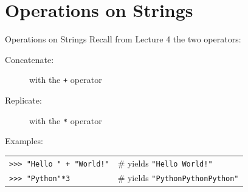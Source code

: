 \documentclass[t,handout,9pt]{beamer}
\begin{document}
\section{Operations on Strings}
\begin{frame}{Operations on Strings}
\vfill
Recall from Lecture 4 the two operators:
\begin{description}
	\item[Concatenate:] with the \texttt{+} operator
	\item[Replicate:] with the \texttt{*} operator
\end{description}
\vfill
Examples:
\begin{table}[]
\begin{flushleft}
\begin{tabular}{ll}
\texttt{>{}>{}> "Hello " + "World!"} &  \# yields \texttt{"Hello World!"}\\
\texttt{>{}>{}> "Python"*3} &  \# yields \texttt{"PythonPythonPython"}\\
\end{tabular}
\end{flushleft}
\end{table}
\vfill
\end{frame}
%
\end{document}

